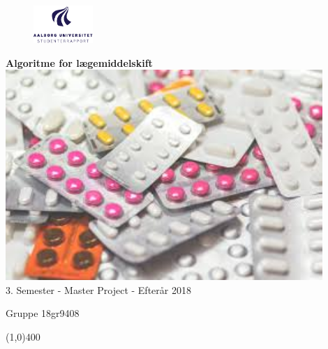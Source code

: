 \clearpage
\thispagestyle{empty}

\begin{figure}[H]
	\raggedleft
	\includegraphics[width=0.2\textwidth]{billeder/aau_logo_da.pdf}
\end{figure} 

\vspace{1cm}

\begin{center}	
	\begin{huge}
		\textbf{Algoritme for lægemiddelskift}\\
		\vspace{3 mm}
		\includegraphics[width=0.9\textwidth]{billeder/forside.jpg} \\
	 	$3.$ Semester - Master Project -  Efterår 2018\\
		\vspace{3 mm}
	\end{huge}
	{\Large Gruppe 18gr9408}
\end{center}
\vspace*{\fill}

\begin{center}
	\line(1,0){400}
\end{center}



